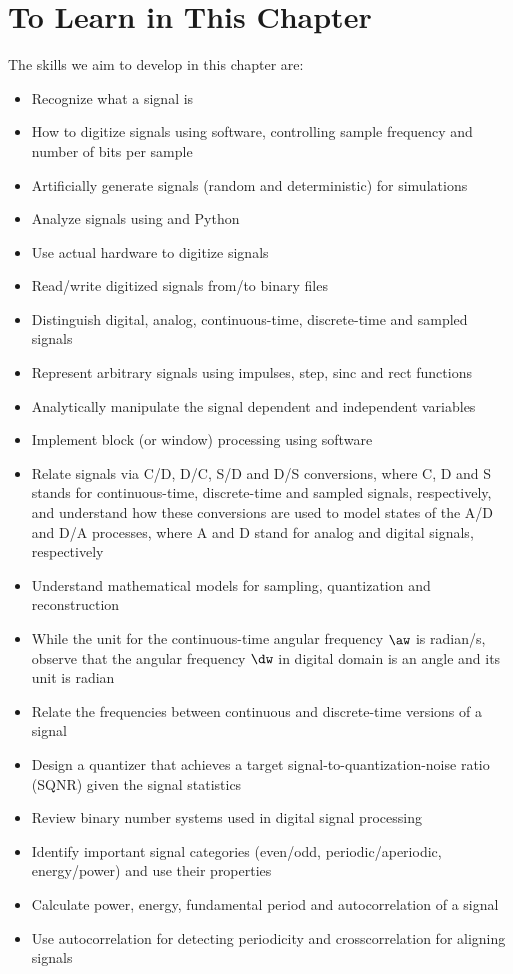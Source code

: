 \section{To Learn in This Chapter}

The skills we aim to develop in this chapter are:
\begin{itemize}
  \item Recognize what a signal is
	\item How to digitize signals using software, controlling sample frequency and number of bits per sample
	\item Artificially generate signals (random and deterministic) for simulations
	\item Analyze signals using {\matlab} and Python
	\item Use actual hardware to digitize signals 
	\item Read/write digitized signals from/to binary files
	\item Distinguish digital, analog, continuous-time, discrete-time and sampled signals
	\item Represent arbitrary signals using impulses, step, sinc and rect functions
	\item Analytically manipulate the signal dependent and independent variables
	\item Implement block (or window) processing using software
	\item Relate signals via C/D, D/C, S/D and D/S conversions, where C, D and S stands for continuous-time,
	discrete-time and sampled signals, respectively, and understand how these conversions are used to model
	states of the A/D and D/A processes, where A and D stand for analog and digital signals, respectively
	\item Understand mathematical models for sampling, quantization and reconstruction
	\item While the unit for the continuous-time angular frequency
	$\aw$ is radian/s, observe that the angular frequency $\dw$ in digital domain is an angle and its unit is radian
	\item Relate the frequencies between continuous and discrete-time versions of a signal
	\item Design a quantizer that achieves a target signal-to-quantization-noise ratio (SQNR) given the signal statistics
	\item Review binary number systems used in digital signal processing
	\item Identify important signal categories (even/odd, periodic/aperiodic, energy/power) and use their properties
	\item Calculate power, energy, fundamental period and autocorrelation of a signal
	\item Use autocorrelation for detecting periodicity and crosscorrelation for aligning signals
\end{itemize}

